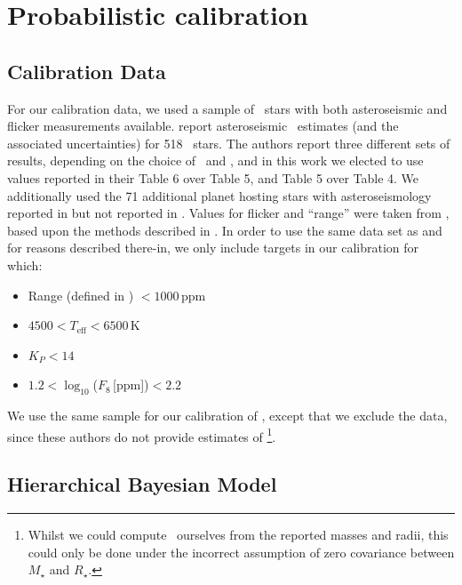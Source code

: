 \section{Probabilistic calibration}
\label{sec:HBM}


\subsection{Calibration Data}

For our calibration data, we used a sample of \Kepler\ stars with
both asteroseismic and flicker measurements available. \citet{Chaplin2014}
report asteroseismic \rhostar\ estimates (and the associated uncertainties) for
518 \Kepler\ stars. The authors report three different sets of results,
depending on the choice of \Teff\ and \FeH, and in this work we elected to use
values reported in their Table 6 over Table 5, and Table 5 over Table 4. We
additionally used the 71 additional planet hosting stars with asteroseismology
reported in \citet{Huber2013} but not reported in \citet{Chaplin2014}. Values
for flicker and ``range'' were taken from \citet{Kipping2014}, based upon the
methods described in \citet{Bastien2013}.
In order to use the same data set as \citet{Kipping2014} and
for reasons described there-in, we only include targets in our calibration for
which:

\begin{itemize}
\item Range (defined in \citet{Bastien2013})
$<1000$\,ppm
\item $4500<T_{\mathrm{eff}}<6500$\,K
\item $K_P<14$
\item $1.2 < \log_{10}$($F_8$\,[ppm])$< 2.2$
\end{itemize}

We use the same sample for our calibration of \logg, except that we exclude the
\citet{Huber2013} data, since these authors do not provide estimates of
\logg\footnote{Whilst we could compute \logg\ ourselves from the reported
masses and radii, this could only be done under the incorrect assumption of
zero covariance between $M_{\star}$ and $R_{\star}$.}.

\subsection{Hierarchical Bayesian Model}

